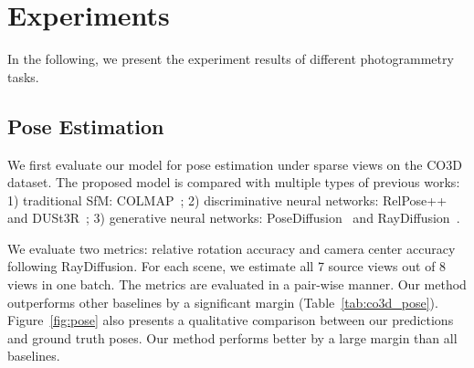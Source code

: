 \section{Experiments}
In the following, we present the experiment results of different photogrammetry tasks. 


\subsection{Pose Estimation}
We first evaluate our model for pose estimation under sparse views on the CO3D dataset. The proposed model is compared with multiple types of previous works: 1) traditional SfM: COLMAP~\cite{schoenberger2016sfm}; 2) discriminative neural networks: RelPose++~\cite{lin2023relpose++} and DUSt3R~\cite{wang2024dust3r}; 3) generative neural networks: PoseDiffusion~\cite{wang2023posediffusion} and RayDiffusion~\cite{zhang2024cameras}. 

We evaluate two metrics: relative rotation accuracy and camera center accuracy following RayDiffusion. For each scene, we estimate all 7 source views out of 8 views in one batch. The metrics are evaluated in a pair-wise manner. Our method outperforms other baselines by a significant margin (Table~\ref{tab:co3d_pose}). Figure~\ref{fig:pose} also presents a qualitative comparison between our predictions and ground truth poses. Our method performs better by a large margin than all baselines.


